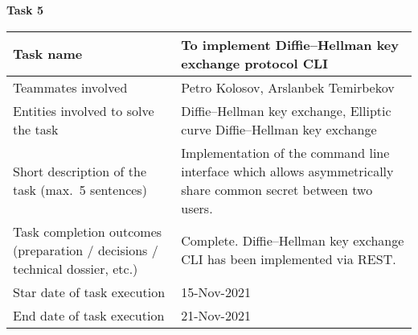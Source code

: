 \vskip 5mm
\hspace*{-6mm}\textbf{Task 5}\\
\begin{tabular}{|p{}|p{}|}
    \hline
    Task name                           & To implement Diffie--Hellman key exchange protocol CLI                    \\
    \hline
    Teammates involved                  & Petro Kolosov, Arslanbek Temirbekov                                       \\
    \hline
    Entities involved to solve the task & Diffie--Hellman key exchange, Elliptic curve Diffie--Hellman key exchange \\
    \hline
    Short description of the task (max.\ 5 sentences) &
    Implementation of the command line interface which allows asymmetrically share common secret between two users. \\
    \hline
    Task completion outcomes (preparation / decisions / technical dossier, etc.) & Complete.
    Diffie--Hellman key exchange CLI has been implemented via REST. \\
    \hline
    Star date of task execution         & 15-Nov-2021                                                               \\
    \hline
    End date of task execution          & 21-Nov-2021                                                               \\
    \hline
\end{tabular}